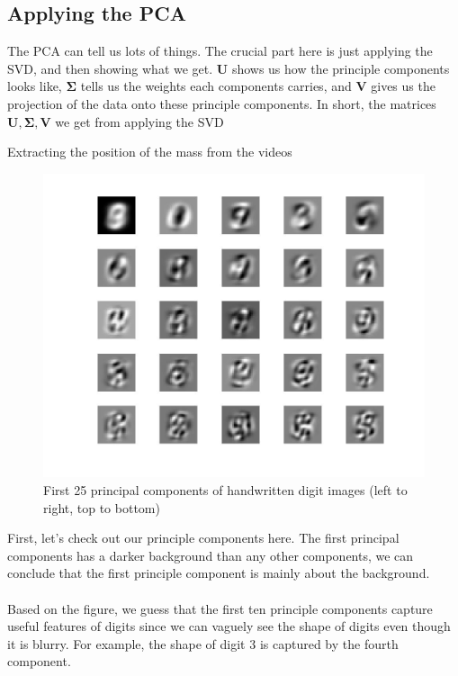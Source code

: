 \documentclass{article}
\begin{document}
\subsection{Applying the PCA}
The PCA can tell us lots of things. The crucial part here is just applying the SVD, and then showing what we get. $\mathbf{U}$ shows us how the principle components looks like, $\mathbf{\Sigma}$ tells us the weights each components carries, and $\mathbf{V}$ gives us the projection of the data onto these principle components.
In short, the matrices $\mathbf{U, \Sigma, V}$ we get from applying the SVD
\newpage
\begin{algorithm}
\begin{algorithmic}
\end{algorithmic}
\caption{Extracting the position of the mass from the videos}
\end{algorithm}
\begin{figure}[h]
    \centerline{\includegraphics[width=5in]{U.jpg}}
    \caption{First 25 principal components of handwritten digit images (left to right, top to bottom)}
\end{figure}
First, let's check out our principle components here. The first principal components has a darker background than any other components, we can conclude that the first principle component is mainly about the background. \\
~\\
Based on the figure, we guess that the first ten principle components capture useful features of digits since we can vaguely see the shape of digits even though it is blurry. For example, the shape of digit 3 is captured by the fourth component. \\
\end{document}
